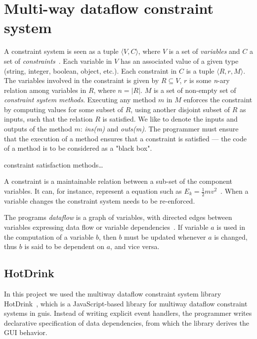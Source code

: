 \chapter{Multi-way dataflow constraint system}
\label{chap:constraint-systems}

A constraint system is seen as a tuple ${\langle V, C \rangle}$, where $V$ is a set of \textit{variables} and $C$ a set of \textit{constraints}~\cite{jarvi_algorithms_2009}. Each variable in $V$ has an associated value of a given type (string, integer, boolean, object, etc.). Each constraint in $C$ is a tuple ${\langle R, r, M \rangle}$. The variables involved in the constraint is given by ${R \subseteq V}$, $r$ is some \textit{n}-ary relation among variables in $R$, where ${n = \lvert R \rvert}$. $M$ is a set of non-empty set of \textit{constraint system methods}. Executing any method $m$ in $M$ enforces the constraint by computing values for some subset of $R$, using another disjoint subset of $R$ as inputs, such that the relation $R$ is satisfied. We like to denote the inputs and outputs of the method $m$: \textit{ins(m)} and \textit{outs(m)}. The programmer must ensure that the execution of a method ensures that a constraint is satisfied --- the code of a method is to be considered as a "black box". 

constraint satisfaction methods…

A constraint is a maintainable relation between a sub-set of the component variables. It can, for instance, represent a equation such as  $E_k = \frac{1}{2}mv^2$~\cite{svartveit2021multithreaded}. When a variable changes the constraint system needs to be re-enforced.

The programs \textit{dataflow} is a graph of variables, with directed edges between variables expressing data flow or variable dependencies~\cite{stokke2020declaratively}. If variable $a$ is used in the computation of a variable $b$, then $b$ must be updated whenever $a$ is changed, thus $b$ is said to be dependent on $a$, and vice versa.

\section{HotDrink}
\label{sec:hotdrink}

In this project we used the multiway dataflow constraint system library 
HotDrink~\cite{HotDrink}, which is a JavaScript-based library for multiway dataflow constraint systems in \gls{gui}s. Instead of writing explicit event handlers, the programmer writes declarative specification of data dependencies, from which the library derives the GUI behavior.

